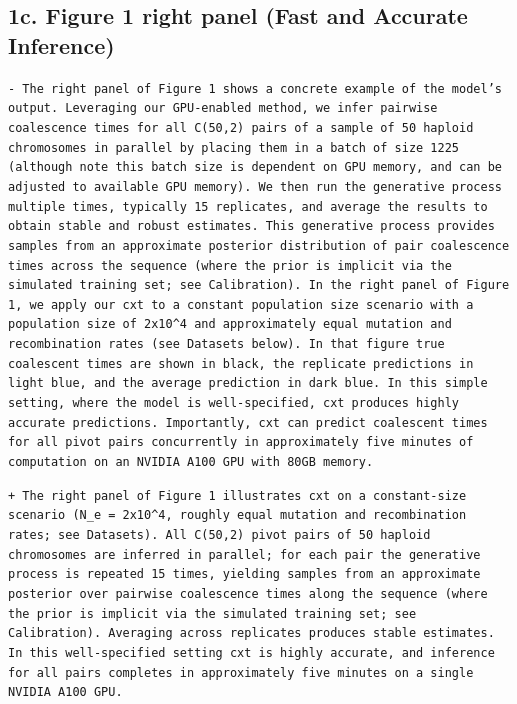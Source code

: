 \documentclass[10pt]{article}
\newcommand{\rem}[1]{\par\noindent\colorbox{rembg}{\parbox{\dimexpr\linewidth-2\fboxsep}{\small\textcolor{remtext}{\texttt{-\ #1}}}}}
\newcommand{\add}[1]{\par\noindent\colorbox{addbg}{\parbox{\dimexpr\linewidth-2\fboxsep}{\small\textcolor{addtext}{\texttt{+\ #1}}}}}
\begin{document}
\subsection*{\small 1c. Figure 1 right panel (Fast and Accurate Inference)}
\begin{mdframed}[style=diffbox]
\rem{The right panel of Figure 1 shows a concrete example of the model's output. Leveraging our GPU-enabled method, we infer pairwise coalescence times for all C(50,2) pairs of a sample of 50 haploid chromosomes in parallel by placing them in a batch of size 1225 (although note this batch size is dependent on GPU memory, and can be adjusted to available GPU memory). We then run the generative process multiple times, typically 15 replicates, and average the results to obtain stable and robust estimates. This generative process provides samples from an approximate posterior distribution of pair coalescence times across the sequence (where the prior is implicit via the simulated training set; see Calibration). In the right panel of Figure 1, we apply our cxt to a constant population size scenario with a population size of 2x10\^{}4 and approximately equal mutation and recombination rates (see Datasets below). In that figure true coalescent times are shown in black, the replicate predictions in light blue, and the average prediction in dark blue. In this simple setting, where the model is well-specified, cxt produces highly accurate predictions. Importantly, cxt can predict coalescent times for all pivot pairs concurrently in approximately five minutes of computation on an NVIDIA A100 GPU with 80GB memory.}
\add{The right panel of Figure 1 illustrates cxt on a constant-size scenario (N\_e = 2x10\^{}4, roughly equal mutation and recombination rates; see Datasets). All C(50,2) pivot pairs of 50 haploid chromosomes are inferred in parallel; for each pair the generative process is repeated 15 times, yielding samples from an approximate posterior over pairwise coalescence times along the sequence (where the prior is implicit via the simulated training set; see Calibration). Averaging across replicates produces stable estimates. In this well-specified setting cxt is highly accurate, and inference for all pairs completes in approximately five minutes on a single NVIDIA A100 GPU.}
\end{mdframed}
\end{document}
